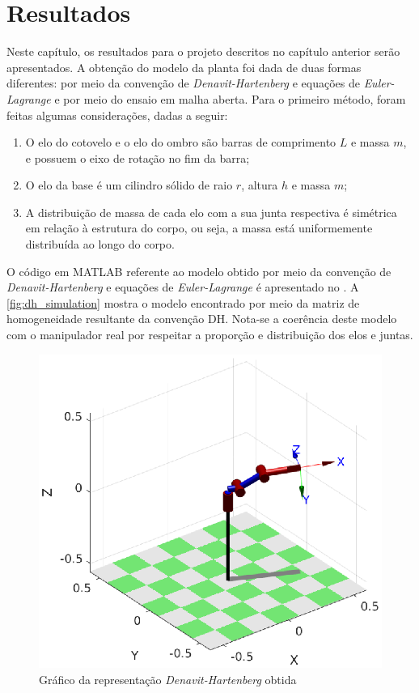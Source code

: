\chapter{Resultados}

Neste capítulo, os resultados para o projeto descritos no capítulo anterior serão apresentados. A obtenção do modelo da 
planta foi dada de duas formas diferentes: por meio da convenção de \textit{Denavit-Hartenberg} e equações de 
\textit{Euler-Lagrange} e por meio do ensaio em malha aberta. Para o primeiro método, foram feitas algumas considerações,
dadas a seguir:
\begin{enumerate}
 \item O elo do cotovelo e o elo do ombro são barras de comprimento $L$ e massa $m$, e possuem o eixo de rotação no fim
 da barra;
 \item O elo da base é um cilindro sólido de raio $r$, altura $h$ e massa $m$;
 \item A distribuição de massa de cada elo com a sua junta respectiva é simétrica em relação à estrutura do corpo, ou seja,
 a massa está uniformemente distribuída ao longo do corpo.
\end{enumerate}

O código em MATLAB referente ao modelo obtido por meio da convenção de \textit{Denavit-Hartenberg} e equações de
\textit{Euler-Lagrange} é apresentado no . A \autoref{fig:dh_simulation} mostra 
o modelo encontrado por meio da matriz de homogeneidade resultante da convenção DH. Nota-se a coerência deste 
modelo com o manipulador real por respeitar a proporção e distribuição dos elos e juntas.

\begin{figure}[ht]
  \centering
  \includegraphics[width = 0.7\columnwidth]{Imagens/dh_simulation}
  \caption{Gráfico da representação \textit{Denavit-Hartenberg} obtida}
  \label{fig:dh_simulation}
\end{figure}

